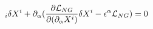 \begin{equation}
 [{\cal L}_{NG}]_i \delta X^i +
\partial_\alpha({\partial{\cal L}_{NG}\over \partial (\partial_\alpha
X^i)}\delta X^i - \epsilon^\alpha {\cal L}_{NG}) = 0
\end{equation}

